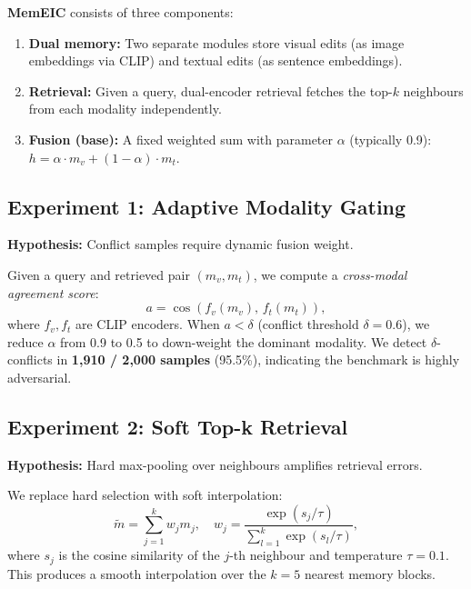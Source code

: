 \documentclass[11pt]{article}
\newcommand{\memeic}{\textbf{MemEIC}}
\begin{document}
\memeic{} consists of three components:
\begin{enumerate}[leftmargin=*,itemsep=1pt]
  \item \textbf{Dual memory:} Two separate modules store visual edits
    (as image embeddings via CLIP) and textual edits (as sentence embeddings).
  \item \textbf{Retrieval:} Given a query, dual-encoder retrieval fetches the
    top-$k$ neighbours from each modality independently.
  \item \textbf{Fusion (base):} A fixed weighted sum with parameter $\alpha$
    (typically 0.9): $h = \alpha \cdot m_v + (1-\alpha) \cdot m_t$.
\end{enumerate}

\subsection{Experiment 1: Adaptive Modality Gating}
\label{sec:exp1_adaptive}

\textbf{Hypothesis:} Conflict samples require dynamic fusion weight.

Given a query and retrieved pair $(m_v, m_t)$, we compute a
\emph{cross-modal agreement score}:
\begin{equation}
  a = \cos(f_v(m_v),\, f_t(m_t)),
\end{equation}
where $f_v, f_t$ are CLIP encoders. When $a < \delta$ (conflict threshold
$\delta=0.6$), we reduce $\alpha$ from 0.9 to 0.5 to down-weight the dominant
modality. We detect $\delta$-conflicts in \textbf{1{,}910 / 2{,}000 samples}
(95.5\%), indicating the benchmark is highly adversarial.

\subsection{Experiment 2: Soft Top-k Retrieval}
\label{sec:exp2_soft}

\textbf{Hypothesis:} Hard max-pooling over neighbours amplifies retrieval
errors.

We replace hard selection with soft interpolation:
\begin{equation}
  \tilde{m} = \sum_{j=1}^{k} w_j m_j, \quad
  w_j = \frac{\exp(s_j / \tau)}{\sum_{l=1}^{k} \exp(s_l / \tau)},
\end{equation}
where $s_j$ is the cosine similarity of the $j$-th neighbour and temperature
$\tau = 0.1$. This produces a smooth interpolation over the $k=5$ nearest
memory blocks.
\end{document}
